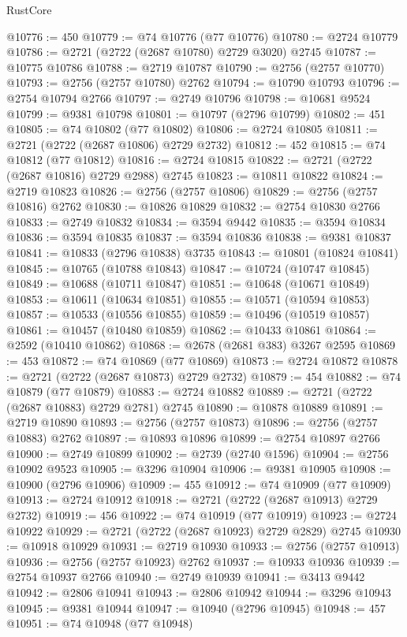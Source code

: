 \begin{lexlean}{RustCore}
\begin{coremodule}
@10776 := 450
@10779 := @74 @10776 (@77 @10776)
@10780 := @2724 @10779
@10786 := @2721 (@2722 (@2687 @10780) @2729 @3020) @2745
@10787 := @10775 @10786
@10788 := @2719 @10787
@10790 := @2756 (@2757 @10770)
@10793 := @2756 (@2757 @10780) @2762
@10794 := @10790 @10793
@10796 := @2754 @10794 @2766
@10797 := @2749 @10796
@10798 := @10681 @9524
@10799 := @9381 @10798
@10801 := @10797 (@2796 @10799)
@10802 := 451
@10805 := @74 @10802 (@77 @10802)
@10806 := @2724 @10805
@10811 := @2721 (@2722 (@2687 @10806) @2729 @2732)
@10812 := 452
@10815 := @74 @10812 (@77 @10812)
@10816 := @2724 @10815
@10822 := @2721 (@2722 (@2687 @10816) @2729 @2988) @2745
@10823 := @10811 @10822
@10824 := @2719 @10823
@10826 := @2756 (@2757 @10806)
@10829 := @2756 (@2757 @10816) @2762
@10830 := @10826 @10829
@10832 := @2754 @10830 @2766
@10833 := @2749 @10832
@10834 := @3594 @9442
@10835 := @3594 @10834
@10836 := @3594 @10835
@10837 := @3594 @10836
@10838 := @9381 @10837
@10841 := @10833 (@2796 @10838) @3735
@10843 := @10801 (@10824 @10841)
@10845 := @10765 (@10788 @10843)
@10847 := @10724 (@10747 @10845)
@10849 := @10688 (@10711 @10847)
@10851 := @10648 (@10671 @10849)
@10853 := @10611 (@10634 @10851)
@10855 := @10571 (@10594 @10853)
@10857 := @10533 (@10556 @10855)
@10859 := @10496 (@10519 @10857)
@10861 := @10457 (@10480 @10859)
@10862 := @10433 @10861
@10864 := @2592 (@10410 @10862)
@10868 := @2678 (@2681 @383) @3267 @2595
@10869 := 453
@10872 := @74 @10869 (@77 @10869)
@10873 := @2724 @10872
@10878 := @2721 (@2722 (@2687 @10873) @2729 @2732)
@10879 := 454
@10882 := @74 @10879 (@77 @10879)
@10883 := @2724 @10882
@10889 := @2721 (@2722 (@2687 @10883) @2729 @2781) @2745
@10890 := @10878 @10889
@10891 := @2719 @10890
@10893 := @2756 (@2757 @10873)
@10896 := @2756 (@2757 @10883) @2762
@10897 := @10893 @10896
@10899 := @2754 @10897 @2766
@10900 := @2749 @10899
@10902 := @2739 (@2740 @1596)
@10904 := @2756 @10902 @9523
@10905 := @3296 @10904
@10906 := @9381 @10905
@10908 := @10900 (@2796 @10906)
@10909 := 455
@10912 := @74 @10909 (@77 @10909)
@10913 := @2724 @10912
@10918 := @2721 (@2722 (@2687 @10913) @2729 @2732)
@10919 := 456
@10922 := @74 @10919 (@77 @10919)
@10923 := @2724 @10922
@10929 := @2721 (@2722 (@2687 @10923) @2729 @2829) @2745
@10930 := @10918 @10929
@10931 := @2719 @10930
@10933 := @2756 (@2757 @10913)
@10936 := @2756 (@2757 @10923) @2762
@10937 := @10933 @10936
@10939 := @2754 @10937 @2766
@10940 := @2749 @10939
@10941 := @3413 @9442
@10942 := @2806 @10941
@10943 := @2806 @10942
@10944 := @3296 @10943
@10945 := @9381 @10944
@10947 := @10940 (@2796 @10945)
@10948 := 457
@10951 := @74 @10948 (@77 @10948)

\end{coremodule}
\end{lexlean}
